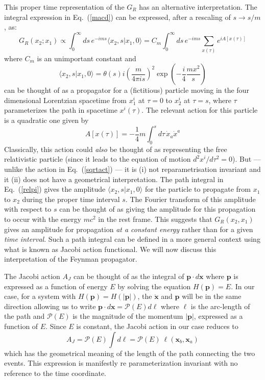 \documentclass[12pt]{article}
\def\eq#1{{Eq.~(\ref{#1})}}
\def\amp#1#2{\langle #1 | #2\rangle}      %
\begin{document}
This  proper time representation of the $G_R$ has an alternative interpretation. The integral expression in \eq{macd} can be expressed, after a rescaling of $s\to s/m$, as:
\begin{equation}
G_R(x_2;x_1) \propto \int_{0}^\infty ds\, e^{-ims} \amp{x_2,s}{x_1,0} = C_m\int_{0}^\infty ds\, e^{-ims}\sum_{x(\tau)} e^{iA[x(\tau)]}
\label{relpi}
\end{equation} 
where $C_m$ is an unimportant constant and
\begin{equation}
 \amp {x_2,s}{x_1,0} =\theta(s) i\left( \frac{m}{4\pi is}\right)^2 \exp\left( -\frac{i}{4} \frac{mx^2}{s}\right)
\label{leu}
\end{equation}
can be thought of as a propagator for a (fictitious) particle moving in the four dimensional Lorentzian spacetime from $x_1^i$ at $\tau=0$ to $x_2^i$ at $\tau =s$, where $\tau$ parameterizes the  path in spacetime $x^i(\tau)$. The relevant action for this  particle is a quadratic one given by
\begin{equation}
A[x(\tau)] = -\frac{1}{4} m \int_0^s d\tau\, \dot x_a \dot x^a
 \label{relact}
\end{equation} 
Classically, this action could \textit{also} be thought of as  representing the free relativistic particle (since it leads to the equation of motion $d^2x^i/d\tau^2 =0$). But --- unlike the action in \eq{sqrtact} --- it is (i) not reparametrisation invariant  and it (ii) does not have a geometrical interpretation. The path integral in \eq{relpi} gives the amplitude $\amp{x_2,s}{x_1,0}$ for the particle to propagate from $x_1$ to $x_2$ during the proper time interval $s$. The Fourier transform of this amplitude with respect to $s$  can be thought of as giving the amplitude for this propagation to occur with the energy $mc^2$ in the rest frame. This suggests that $G_R(x_2,x_1)$ gives an amplitude for propagation \textit{at a constant energy} rather than for a given \textit{time interval}. Such a path integral can be defined in a more general context using what is known as Jacobi action functional. We will now discuss this interpretation of the Feynman propagator. 


The Jacobi action $A_J$ can be thought of as the integral of $\bm{p\cdot}d\bm{{x}}$ where $\bm{p}$ is expressed as a function of energy $E$ by solving the equation $H(\bm{p}) = E$. In our case, for a system with $H(\bm{p}) = H(|\bm{p}|)$, the $\dot{\bm{x}}$ and $\bm{p}$ will be in the same direction allowing us to write $\bm{p\cdot}d\bm{{x}}= \mathcal{P}(E) d\ell$ where $\ell$ is the arc-length of the path and $\mathcal{P}(E)$ is the magnitude of the momentum $|\bm p|$, expressed as a function of $E$. Since $E$ is constant, the Jacobi action in our case reduces to 
\begin{equation}
A_J = \mathcal{P}(E) \int d\ell = \mathcal{P}(E) \ \ell(\bm{x}_b, \bm{x}_a)
\end{equation} 
which has the geometrical meaning of the length of the path connecting the two events. This expression
is  manifestly re parameterization invariant with no reference to the time coordinate.
\end{document}
